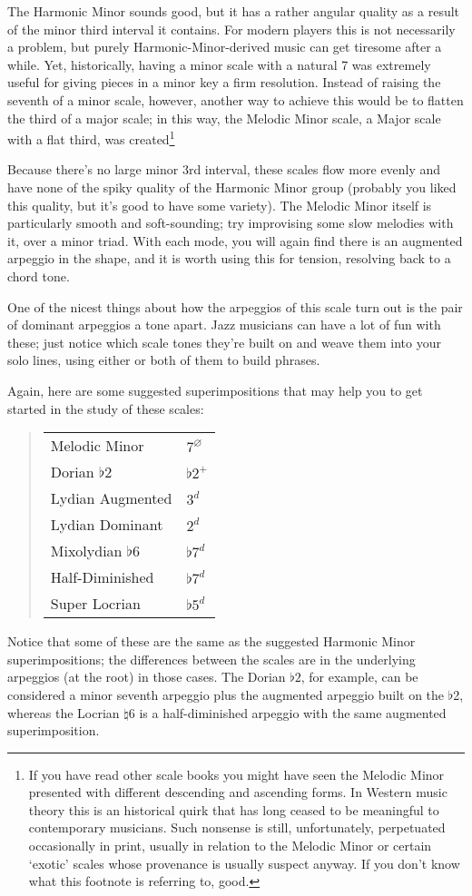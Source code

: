 \documentclass[english]{./gbook}
\begin{document}
\begin{large}
The Harmonic Minor sounds good, but it has a rather angular quality as a result of the minor third interval it contains. For modern players this is not necessarily a problem, but purely Harmonic-Minor-derived music can get tiresome after a while. Yet, historically, having a minor scale with a natural 7 was extremely useful for giving pieces in a minor key a firm resolution. Instead of raising the seventh of a minor scale, however, another way to achieve this would be to flatten the third of a major scale; in this way, the Melodic Minor scale, a Major scale with a flat third, was created\footnote{If you have read other scale books you might have seen the Melodic Minor presented with different descending and ascending forms. In Western music theory this is an historical quirk that has long ceased to be meaningful to contemporary musicians. Such nonsense is still, unfortunately, perpetuated occasionally in print, usually in relation to the Melodic Minor or certain `exotic' scales whose provenance is usually suspect anyway. If you don't know what this footnote is referring to, good.}

Because there's no large minor 3rd interval, these scales flow more evenly and have none of the spiky quality of the Harmonic Minor group (probably you liked this quality, but it's good to have some variety). The Melodic Minor itself is particularly smooth and soft-sounding; try improvising some slow melodies with it, over a minor triad. With each mode, you will again find there is an augmented arpeggio in the shape, and it is worth using this for tension, resolving back to a chord tone.

One of the nicest things about how the arpeggios of this scale turn out is the pair of dominant arpeggios a tone apart. Jazz musicians can have a lot of fun with these; just notice which scale tones they're built on and weave them into your solo lines, using either or both of them to build phrases.

Again, here are some suggested superimpositions that may help you to get started in the study of these scales:
\begin{quote}
	\begin{tabular}{ll}
	Melodic Minor & $7^{\varnothing}$\\
	Dorian $\flat 2$ & $\flat 2^+$\\
	Lydian Augmented & $3^d$\\
	Lydian Dominant & $2^d$\\
	Mixolydian $\flat 6$ & $\flat 7^d$\\
	Half-Diminished & $\flat 7^d$\\
	Super Locrian & $\flat 5^d$
	\end{tabular}
\end{quote}
Notice that some of these are the same as the suggested Harmonic Minor superimpositions; the differences between the scales are in the underlying arpeggios (at the root) in those cases. The Dorian $\flat 2$, for example, can be considered a minor seventh arpeggio plus the augmented arpeggio built on the $\flat$2, whereas the Locrian $\natural 6$ is a half-diminished arpeggio with the same augmented superimposition.


\end{large}
\end{document}

